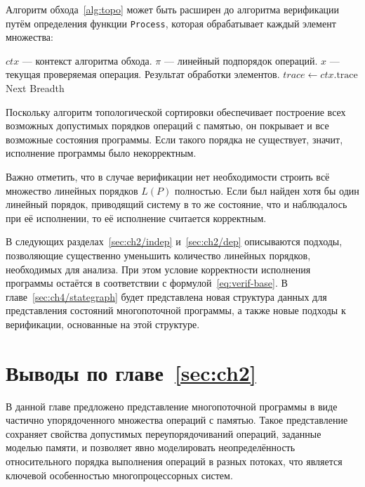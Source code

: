 Алгоритм обхода~\ref{alg:topo} может быть расширен до алгоритма
верификации путём определения функции \texttt{Process}, которая
обрабатывает каждый элемент множества:

\begin{algorithm}[H]
  \caption{Верификация результата исполнения программы по линейному порядку}
  \label{alg:verif-linext}
  \begin{algorithmic}[1]
    \Require $ctx$ — контекст алгоритма обхода.
    \Require $\pi$ — линейный подпорядок операций.
    \Require $x$ — текущая проверяемая операция.
    \Ensure Результат обработки элементов.
    \State $trace \gets ctx.\text{trace}$ 
    \State \Return Next 
    \Else
    \State \Return Breadth 
    \EndIf
    \EndFunction
  \end{algorithmic}
\end{algorithm}

Поскольку алгоритм топологической сортировки обеспечивает построение
всех возможных допустимых порядков операций с памятью, он покрывает и
все возможные состояния программы. Если такого порядка не существует,
значит, исполнение программы было некорректным.

Важно отметить, что в случае верификации нет необходимости строить
всё множество линейных порядков $L(P)$ полностью. Если был найден
хотя бы один линейный порядок, приводящий систему в то же состояние,
что и наблюдалось при её исполнении, то её исполнение считается корректным.

В следующих разделах~\ref{sec:ch2/indep} и~\ref{sec:ch2/dep}
описываются подходы, позволяющие существенно уменьшить количество
линейных порядков, необходимых для анализа. При этом условие
корректности исполнения программы остаётся в соответствии с
формулой~\eqref{eq:verif-base}. В главе~\ref{sec:ch4/stategraph}
будет представлена новая структура данных для представления состояний
многопоточной программы, а также новые подходы к верификации,
основанные на этой структуре.

\section{Выводы по главе~\ref{sec:ch2}}

В данной главе предложено представление многопоточной программы в
виде частично упорядоченного множества операций с памятью. Такое
представление сохраняет свойства допустимых переупорядочиваний
операций, заданные моделью памяти, и позволяет явно моделировать
неопределённость относительного порядка выполнения операций в разных
потоках, что является ключевой особенностью многопроцессорных систем.

